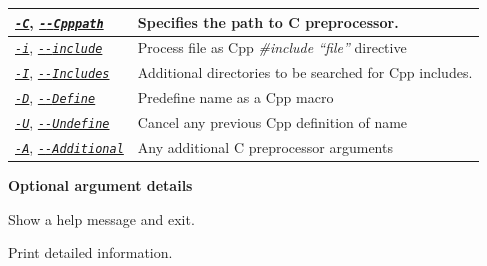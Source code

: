 \documentclass[A4paper,10pt,english]{sphinxmanual}
\begin{document}
\begin{tabulary}{\linewidth}{|L|L|}
{\hyperref[user/use:cmdoption-C]{\emph{\texttt{-C}}}}, {\hyperref[user/use:cmdoption-C]{\emph{\texttt{-{-}Cpppath}}}}
 & 
Specifies the path to C preprocessor.
\\\hline

{\hyperref[user/use:cmdoption-i]{\emph{\texttt{-i}}}}, {\hyperref[user/use:cmdoption-i]{\emph{\texttt{-{-}include}}}}
 & 
Process file as Cpp \emph{\#include ``file''} directive
\\\hline

{\hyperref[user/use:cmdoption-I]{\emph{\texttt{-I}}}}, {\hyperref[user/use:cmdoption-I]{\emph{\texttt{-{-}Includes}}}}
 & 
Additional directories to be searched for Cpp includes.
\\\hline

{\hyperref[user/use:cmdoption-D]{\emph{\texttt{-D}}}}, {\hyperref[user/use:cmdoption-D]{\emph{\texttt{-{-}Define}}}}
 & 
Predefine name as a Cpp macro
\\\hline

{\hyperref[user/use:cmdoption-U]{\emph{\texttt{-U}}}}, {\hyperref[user/use:cmdoption-U]{\emph{\texttt{-{-}Undefine}}}}
 & 
Cancel any previous Cpp definition of name
\\\hline

{\hyperref[user/use:cmdoption-A]{\emph{\texttt{-A}}}}, {\hyperref[user/use:cmdoption-A]{\emph{\texttt{-{-}Additional}}}}
 & 
Any additional C preprocessor arguments
\\\hline
\end{tabulary}


\textbf{Optional argument details}

\begin{fulllineitems}
\label{user/use:cmdoption-h}
Show a help message and exit.

\end{fulllineitems}


\begin{fulllineitems}
\label{user/use:cmdoption-v}
Print detailed information.

\end{fulllineitems}

\end{document}
